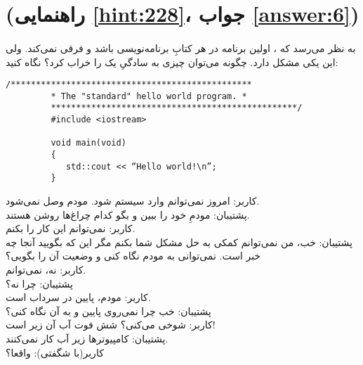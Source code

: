 \section[\lr{"Hello World"}]{ (راهنمایی \ref{hint:228}، جواب \ref{answer:6})}
\paragraph{}\label{prog:1}
به نظر می‌رسد که ، اولین برنامه در هر کتابِ برنامه‌نویسی باشد و فرقی نمی‌کند. ولی این یکی مشکل دارد. چگونه می‌توان چیزی به سادگیِ یک  را خراب کرد؟ نگاه کنید:

\begin{LTR}
        \begin{lstlisting}[style=C++Style]
         /************************************************
         * The "standard" hello world program. *
         *************************************************/
         #include <iostream>

         void main(void)
         {
            std::cout << “Hello world!\n”;
         }
        \end{lstlisting}
\end{LTR}

\begin{tcolorbox}
    کاربر: امروز نمی‌توانم وارد سیستم شود. مودم وصل نمی‌شود.\\
    پشتیبان: مودمِ خود را ببین و بگو کدام چراغ‌ها روشن هستند.\\
    کاربر: نمی‌توانم این کار را بکنم.\\
    پشتیبان: خب، من نمی‌توانم کمکی به حل مشکل شما بکنم مگر این که بگویید آنجا چه خبر است. نمی‌توانی به مودم نگاه کنی و وضعیت آن را بگویی؟\\
    کاربر: نه، نمی‌توانم.\\
    پشتیبان: چرا نه؟\\
    کاربر: مودم، پایین در سرداب است.\\
    پشتیبان: خب چرا نمی‌روی پایین و به آن نگاه کنی؟\\
    کاربر: شوخی می‌کنی؟ شش فوت آب آن زیر است!\\
    پشتیبان: کامپیوترها زیر آب کار نمی‌کنند.\\
    کاربر(با شگفتی): واقعا؟
\end{tcolorbox}